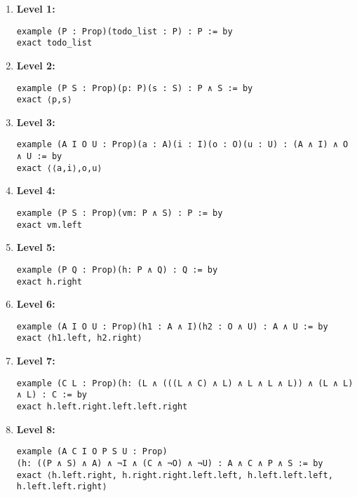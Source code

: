 \documentclass{article}
\begin{document}
\begin{enumerate}
    \item \textbf{Level 1:} \\
    \begin{lstlisting}[style=leanstyle]
example (P : Prop)(todo_list : P) : P := by
exact todo_list
    \end{lstlisting}

    \item \textbf{Level 2:} \\
    \begin{lstlisting}[style=leanstyle]
example (P S : Prop)(p: P)(s : S) : P ∧ S := by
exact ⟨p,s⟩
    \end{lstlisting}

    \item \textbf{Level 3:} \\
    \begin{lstlisting}[style=leanstyle]
example (A I O U : Prop)(a : A)(i : I)(o : O)(u : U) : (A ∧ I) ∧ O ∧ U := by
exact ⟨⟨a,i⟩,o,u⟩
    \end{lstlisting}

    \item \textbf{Level 4:} \\
    \begin{lstlisting}[style=leanstyle]
example (P S : Prop)(vm: P ∧ S) : P := by
exact vm.left
    \end{lstlisting}

    \item \textbf{Level 5:} \\
    \begin{lstlisting}[style=leanstyle]
example (P Q : Prop)(h: P ∧ Q) : Q := by
exact h.right
    \end{lstlisting}

    \item \textbf{Level 6:} \\
    \begin{lstlisting}[style=leanstyle]
example (A I O U : Prop)(h1 : A ∧ I)(h2 : O ∧ U) : A ∧ U := by
exact ⟨h1.left, h2.right⟩
    \end{lstlisting}

    \item \textbf{Level 7:} \\
    \begin{lstlisting}[style=leanstyle]
example (C L : Prop)(h: (L ∧ (((L ∧ C) ∧ L) ∧ L ∧ L ∧ L)) ∧ (L ∧ L) ∧ L) : C := by
exact h.left.right.left.left.right
    \end{lstlisting}

    \item \textbf{Level 8:} \\
    \begin{lstlisting}[style=leanstyle]
example (A C I O P S U : Prop)
(h: ((P ∧ S) ∧ A) ∧ ¬I ∧ (C ∧ ¬O) ∧ ¬U) : A ∧ C ∧ P ∧ S := by
exact ⟨h.left.right, h.right.right.left.left, h.left.left.left, h.left.left.right⟩
    \end{lstlisting}
\end{enumerate}
\end{document}
